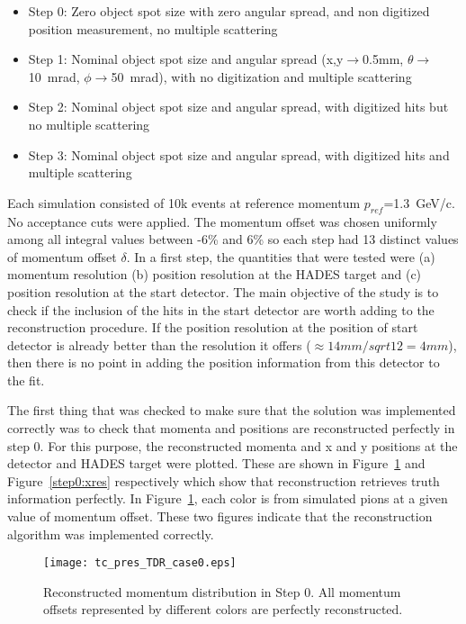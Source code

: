 \documentclass[20]{article}
\begin{document}
\begin{itemize}
  \item Step 0: Zero object spot size with zero angular spread, and
    non digitized position measurement, no multiple scattering
  \item Step 1: Nominal object spot size and angular spread
    (x,y$\rightarrow$0.5mm, $\theta\rightarrow$10~mrad, $\phi\rightarrow$50~mrad), with no
    digitization and multiple scattering
  \item Step 2: Nominal object spot size and angular spread, with
    digitized hits but no multiple scattering
  \item Step 3: Nominal object spot size and angular spread, with
    digitized hits and multiple scattering
\end{itemize}

Each simulation consisted of 10k events at reference momentum
$p_{ref}$=1.3~GeV/c. No acceptance cuts were applied. The momentum
offset was chosen uniformly among all integral values between -6\% and
6\% so each step had 13 distinct values of momentum offset
$\delta$. In a first step, the quantities that were tested were (a)
momentum resolution (b) position resolution at the HADES target and
(c) position resolution at the start detector. The main objective of
the study is to check if the inclusion of the hits in the start
detector are worth adding to the reconstruction procedure. If the
position resolution at the position of start detector is already
better than the resolution it offers ($\approx 14mm/sqrt{12} = 4mm$),
then there is no point in adding the position information from this
detector to the fit.

The first thing that was checked to make sure that the solution was
implemented correctly was to check that momenta and positions are
reconstructed perfectly in step 0. For this purpose, the reconstructed
momenta and x and y positions at the detector and HADES target were
plotted. These are shown in Figure~\ref{step0:pres} and
Figure~\ref{step0:xres} respectively which show that reconstruction
retrieves truth information perfectly. In Figure~\ref{step0:pres},
each color is from simulated pions at a given value of momentum
offset. These two figures indicate that the reconstruction algorithm
was implemented correctly.

\begin{figure}[tbp]
  \texttt{[image: tc\_pres\_TDR\_case0.eps]}
  \caption{Reconstructed momentum distribution in Step 0. All momentum
    offsets represented by different colors are perfectly
    reconstructed.}
  \label {step0:pres}
\end{figure}
\end{document}
